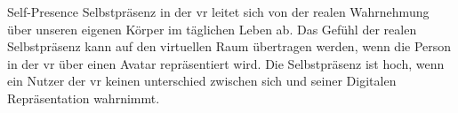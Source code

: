 \documentclass[a4paper,11pt]{article}%
\renewcommand{\\}{\vspace*{0.5\baselineskip} \newline}
\begin{document}


Self-Presence
Selbstpräsenz in der \ac{vr} leitet sich von der realen Wahrnehmung über unseren eigenen Körper im täglichen Leben ab. Das Gefühl der realen Selbstpräsenz kann auf den virtuellen Raum übertragen werden, wenn die Person in der \ac{vr} über einen Avatar repräsentiert wird. Die Selbstpräsenz ist hoch, wenn ein Nutzer der \ac{vr} keinen unterschied zwischen sich und seiner Digitalen Repräsentation wahrnimmt.
\end{document}
